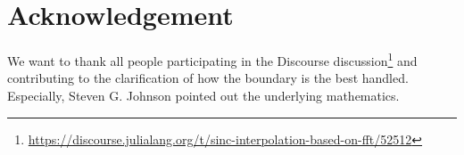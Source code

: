 \documentclass{juliacon}
\begin{document}
\section{Acknowledgement}
We want to thank all people participating in the Discourse discussion\footnote{\url{https://discourse.julialang.org/t/sinc-interpolation-based-on-fft/52512}} and contributing to the clarification of how the boundary is the best handled.
Especially, Steven G. Johnson pointed out the underlying mathematics.



\end{document}
